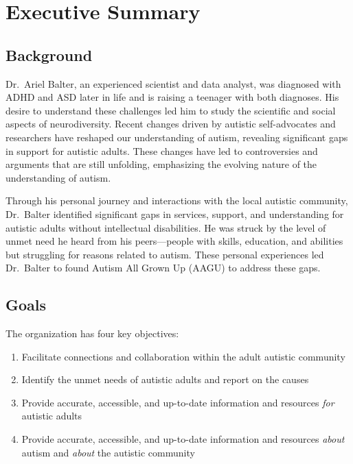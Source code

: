 \documentclass[
  letterpaper,
  DIV=11,
  numbers=noendperiod]{scrreprt}
\providecommand{\tightlist}{%
  \setlength{\itemsep}{0pt}\setlength{\parskip}{0pt}}\usepackage{longtable,booktabs,array}
\begin{document}

\hypertarget{sec-executive_summary}{%
\chapter{Executive Summary}\label{sec-executive_summary}}

\hypertarget{sec-ex_sum_background}{%
\section{Background}\label{sec-ex_sum_background}}

Dr.~Ariel Balter, an experienced scientist and data analyst, was
diagnosed with ADHD and ASD later in life and is raising a teenager with
both diagnoses. His desire to understand these challenges led him to
study the scientific and social aspects of neurodiversity. Recent
changes driven by autistic self-advocates and researchers have reshaped
our understanding of autism, revealing significant gaps in support for
autistic adults. These changes have led to controversies and arguments
that are still unfolding, emphasizing the evolving nature of the
understanding of autism.

Through his personal journey and interactions with the local autistic
community, Dr.~Balter identified significant gaps in services, support,
and understanding for autistic adults without intellectual disabilities.
He was struck by the level of unmet need he heard from his
peers---people with skills, education, and abilities but struggling for
reasons related to autism. These personal experiences led Dr.~Balter to
found Autism All Grown Up (AAGU) to address these gaps.

\hypertarget{sec-ex_sum_goals}{%
\section{Goals}\label{sec-ex_sum_goals}}

The organization has four key objectives:

\begin{enumerate}
\def\labelenumi{\arabic{enumi}.}
\tightlist
\item
  Facilitate connections and collaboration within the adult autistic
  community
\item
  Identify the unmet needs of autistic adults and report on the causes
\item
  Provide accurate, accessible, and up-to-date information and resources
  \emph{for} autistic adults
\item
  Provide accurate, accessible, and up-to-date information and resources
  \emph{about} autism and \emph{about} the autistic community
\end{enumerate}
\end{document}
